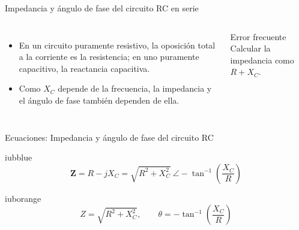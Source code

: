 \documentclass[aspectratio=169,11pt,xcolor={table}]{beamer}
\begin{document}
\begin{frame}{{\normalsize Impedancia y ángulo de fase del circuito RC en serie}}
\begin{columns}[c,onlytextwidth]
\small
\begin{itemize}\setlength{\itemsep}{4pt}
  \item En un circuito puramente resistivo, la oposición total a la corriente es la resistencia; en uno puramente capacitivo, la reactancia capacitiva.
  \item Como $X_C$ depende de la frecuencia, la impedancia y el ángulo de fase también dependen de ella.
\end{itemize}
\begin{cardO}{Error frecuente}
\footnotesize Calcular la impedancia como $R + X_C$.
\end{cardO}
\end{columns}
\end{frame}

\begin{frame}{{\normalsize Ecuaciones: Impedancia y ángulo de fase del circuito RC}}
\begin{cajaplana}{iubblue}
\centering
{\large
\begin{equation*}
  \mathbf{Z} = R - jX_C = \sqrt{R^{2} + X_C^{2}}\ \angle -\tan^{-1}\!\left(\frac{X_C}{R}\right)
\end{equation*}
}
\end{cajaplana}
\vspace{1mm}
\begin{cajaplana}{iuborange}
\centering
{\large
\begin{equation*}
  Z = \sqrt{R^{2} + X_C^{2}}, \qquad \theta = -\tan^{-1}\!\left(\frac{X_C}{R}\right)
\end{equation*}
}
\end{cajaplana}
\end{frame}
\end{document}
